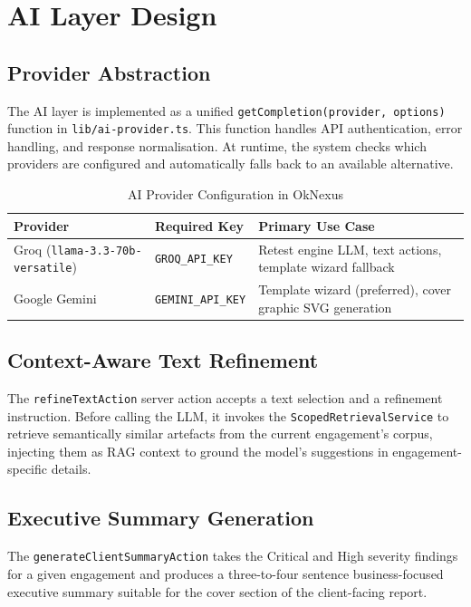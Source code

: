 \section{AI Layer Design}

\subsection{Provider Abstraction}

The AI layer is implemented as a unified \texttt{getCompletion(provider, options)} function in \texttt{lib/ai-provider.ts}. This function handles API authentication, error handling, and response normalisation. At runtime, the system checks which providers are configured and automatically falls back to an available alternative.

\begin{table}[h!]
\centering
\caption{AI Provider Configuration in OkNexus}
\label{tab:ai_providers}
\begin{tabular}{|l|l|p{5.5cm}|}
\hline
\textbf{Provider} & \textbf{Required Key} & \textbf{Primary Use Case} \\
\hline
Groq (\texttt{llama-3.3-70b-versatile}) & \texttt{GROQ\_API\_KEY} & Retest engine LLM, text actions, template wizard fallback \\
Google Gemini & \texttt{GEMINI\_API\_KEY} & Template wizard (preferred), cover graphic SVG generation \\
\hline
\end{tabular}
\end{table}

\subsection{Context-Aware Text Refinement}

The \texttt{refineTextAction} server action accepts a text selection and a refinement instruction. Before calling the LLM, it invokes the \texttt{ScopedRetrievalService} to retrieve semantically similar artefacts from the current engagement's corpus, injecting them as RAG context to ground the model's suggestions in engagement-specific details.

\subsection{Executive Summary Generation}

The \texttt{generateClientSummaryAction} takes the Critical and High severity findings for a given engagement and produces a three-to-four sentence business-focused executive summary suitable for the cover section of the client-facing report.

